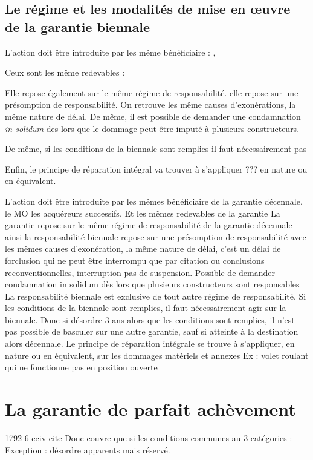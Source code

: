 		\subsection{Le régime et les modalités de mise en œuvre de la garantie biennale}

			L'action doit être introduite par les même bénéficiaire : \Mo,

			Ceux sont les même redevables :

			Elle repose également sur le même régime de responsabilité. elle repose sur une présomption de responsabilité. On retrouve les même causes d'exonérations, la même nature de délai. De même, il est possible de demander une condamnation \emph{in solidum} des lors que le dommage peut être imputé à plusieurs constructeurs.

			De même, si les conditions de la biennale sont remplies il faut nécessairement pas \rcdc

			Enfin, le principe de réparation intégral va trouver à s'appliquer ??? en nature ou en équivalent.

			L’action doit être introduite par les mêmes bénéficiaire de la garantie décennale, le MO les acquéreurs successifs. Et les mêmes redevables de la garantie
			La garantie repose sur le même régime de responsabilité de la garantie décennale ainsi la responsabilité biennale repose sur une présomption de responsabilité avec les mêmes causes d’exonération, la même nature de délai, c’est un délai de forclusion qui ne peut être interrompu que par citation ou conclusions reconventionnelles, interruption pas de suspension.
			Possible de demander condamnation in solidum dès lors que plusieurs constructeurs sont responsables
			La responsabilité biennale est exclusive de tout autre régime de responsabilité. Si les conditions de la biennale sont remplies, il faut nécessairement agir sur la biennale. Donc si désordre 3 ans alors que les conditions sont remplies, il n’est pas possible de basculer sur une autre garantie, sauf si atteinte à la destination alors décennale.
			Le principe de réparation intégrale se trouve à s’appliquer, en nature ou en équivalent, sur les dommages matériels et annexes
			Ex : volet roulant qui ne fonctionne pas en position ouverte


\section{La garantie de parfait achèvement}

1792-6 cciv cite
Donc couvre que si les conditions communes au 3 catégories :
Exception : désordre apparents mais réservé.

